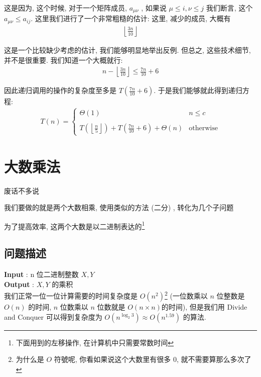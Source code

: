 \documentclass[a4paper, 10pt]{ctexart} %
\begin{document}
这是因为, 这个时候, 对于一个矩阵成员, $a_{\mu \nu}$ , 如果说 $ \mu \le i , \nu \le j$ 我们断言, 这个 $a_{\mu\nu} \le a_{ij}$.
这里我们进行了一个非常粗糙的估计: 这里, 减少的成员, 大概有
\begin{align*}
    \left\lfloor \frac{3n}{10} \right\rfloor
\end{align*}

这是一个比较缺少考虑的估计, 我们能够明显地举出反例. 但总之, 这些技术细节, 并不是很重要. 我们知道一个大概就行: 
\begin{align*}
    n  - \left\lfloor \frac{3n}{10}\right\rfloor \le \frac{7n}{10}   +6 
\end{align*}

因此递归调用的操作的复杂度至多是 $ T \left( \frac{7n}{ 10} + 6\right)$. 于是我们能够就此得到递归方程: 
\begin{align*}
    T \left(n \right) =  
    \begin{cases}
        \Theta \left(1\right) & n \le c \\ \\
        T \displaystyle \left( \left\lfloor  \frac{n}{5} \right\rfloor \right) + T \left( \frac{7n}{10} + 6\right) + \Theta \left(n\right) & \text{otherwise}
    \end{cases}
\end{align*}

\section{大数乘法}
废话不多说 

我们要做的就是两个大数相乘, 使用类似的方法 (二分) , 转化为几个子问题

为了提高效率, 这两个大数是以二进制表达的\footnote{下面用到的左移操作, 在计算机中只需要常数时间}
\\ [8pt]
\subsection{问题描述}
\noindent\textbf{Input} : n 位二进制整数 $X , Y$ \\
\textbf{Output} : $X, Y$ 的乘积 \\
我们正常一位一位计算需要的时间复杂度是 $O\left( n^{2}\right)$\footnote{为什么是
$O$ 符號呢, 你看如果说这个大数里有很多 $0$, 就不需要算那么多次了} (一位数乘以 $n$
位整数是 $O \left(n\right)$ 的时间, $n$ 位数乘以 $n$ 位数就是 $O (n \times n  
)$的时间), 但是我们用 Divide and Conquer 
可以得到复杂度为 $O\left( n ^{\log_{2} 3}\right)\approx O\left( n ^{1.59}\right)$ 的算法.
\end{document}
